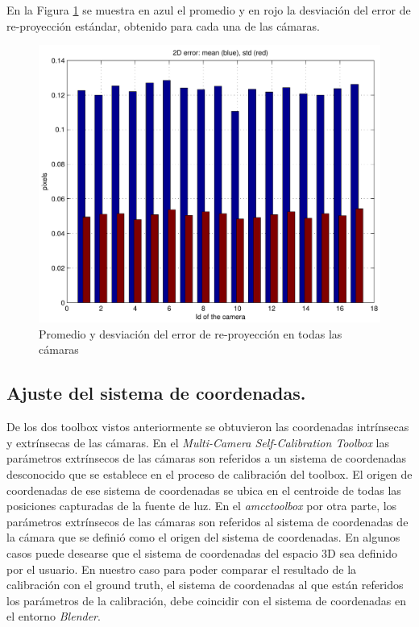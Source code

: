 En la Figura \ref{fig: error reproyeccion} se muestra en azul el promedio y en rojo la desviación del error de re-proyección estándar, obtenido para cada una de las cámaras.

\begin{figure}[ht!]
\begin{center}
\includegraphics[scale=0.5]{img/calibracion/reprerrors.pdf}
\end{center}

\caption{Promedio y desviación  del error de re-proyección en todas las cámaras }
\label{fig: error reproyeccion}
\end{figure}
  
\subsection{Ajuste del sistema de coordenadas.}

De los dos toolbox vistos anteriormente se obtuvieron las coordenadas intrínsecas y extrínsecas de las cámaras. En el \textit{Multi-Camera Self-Calibration Toolbox} las parámetros extrínsecos de las cámaras son referidos a un sistema de coordenadas desconocido que se establece en el proceso de calibración del toolbox. El origen de coordenadas de ese sistema de coordenadas se ubica en el centroide de todas las posiciones capturadas de la fuente de luz. En el \textit{amcctoolbox} por otra parte, los parámetros extrínsecos de las cámaras son referidos al sistema de coordenadas de la cámara que se definió como el origen del sistema de coordenadas. En algunos casos puede desearse que el sistema de coordenadas del espacio 3D sea definido por el usuario. En nuestro caso para poder comparar el resultado de la calibración con el ground truth, el sistema de coordenadas al que están referidos los parámetros de la calibración, debe coincidir con el sistema de coordenadas  en el entorno \emph{Blender}.\\


